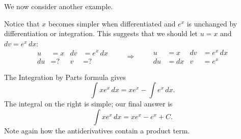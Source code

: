 

We now consider another example.

{Notice that $x$ becomes simpler when differentiated and $e^x$ is unchanged by differentiation or integration. This suggests that we should let $u=x$ and $dv=e^x\, dx$:
\[
\begin{aligned}
u&= x & dv&=e^x\, dx\\
du&= \text{?} & v&=\text{?}
\end{aligned}
\qquad\Rightarrow\qquad
\begin{aligned}
u&= x & dv&=e^x\, dx\\
du&= dx & v&=e^x
\end{aligned}
\]

The Integration by Parts formula gives
\[\int x e^x\,dx = xe^x - \int e^x\,dx.\]
The integral on the right is simple; our final answer is
\[\int xe^x\, dx = xe^x - e^x + C.\]
Note again how the antiderivatives contain a product term.}

